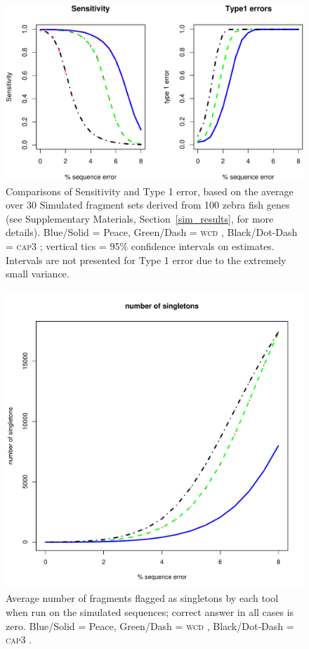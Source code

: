 \documentclass[a4,center,fleqn]{NAR}
\newcommand{\wcd}{\textsc{wcd }}
\newcommand{\capthree}{\textsc{cap3 }}
\begin{document}
\begin{figure}[b]
\centerline{
\includegraphics[scale=0.5]{pics.d/SeT1.pdf} 
}
\label{SeT1}
\caption{Comparisons of Sensitivity and Type 1 error, based on the
  average over 30 Simulated fragment sets derived from 100 zebra fish genes
  (see Supplementary Materials, Section~\ref{sim_results}, for more
  details).   Blue/Solid = {\sc Peace}, Green/Dash =
  \wcd, Black/Dot-Dash = \capthree; vertical tics = 95\% confidence
  intervals on estimates.  Intervals are not presented for Type 1
  error due to the extremely small variance.}
\end{figure}

\begin{figure}[b]
\centerline{
\includegraphics[scale=0.35]{pics.d/singletons.pdf}
}
\label{singletons}
\caption{Average number of fragments flagged as singletons by each tool
  when run on the simulated sequences; correct answer in all cases is
  zero.  Blue/Solid = {\sc Peace}, Green/Dash = \wcd,
  Black/Dot-Dash = \capthree.}
\end{figure}
\end{document}
